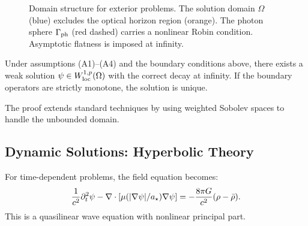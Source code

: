 \begin{figure}[t]
\centering
{}
\caption{Domain structure for exterior problems. The solution domain 
$\Omega$ (blue) excludes the optical horizon region (orange). The photon 
sphere $\Gamma_{\rm ph}$ (red dashed) carries a nonlinear Robin condition.
Asymptotic flatness is imposed at infinity.}
\label{fig:exterior_domain}
\end{figure}

\begin{theorem}\label{thm:exterior}
Under assumptions (A1)--(A4) and the boundary conditions above, there 
exists a weak solution $\psi \in W^{1,p}_{\rm loc}(\Omega)$ with the 
correct decay at infinity. If the boundary operators are strictly monotone, 
the solution is unique.
\end{theorem}

The proof extends standard techniques by using weighted Sobolev spaces 
to handle the unbounded domain.

\subsection{Dynamic Solutions: Hyperbolic Theory}\label{sec:hyperbolic}

For time-dependent problems, the field equation becomes:
\begin{equation}
\frac{1}{c^2}\partial_t^2\psi - \nabla\cdot[\mu(|\nabla\psi|/a_\star)\nabla\psi] 
= -\frac{8\pi G}{c^2}(\rho - \bar{\rho}).
\label{eq:dynamic_field}
\end{equation}
This is a quasilinear wave equation with nonlinear principal part.

